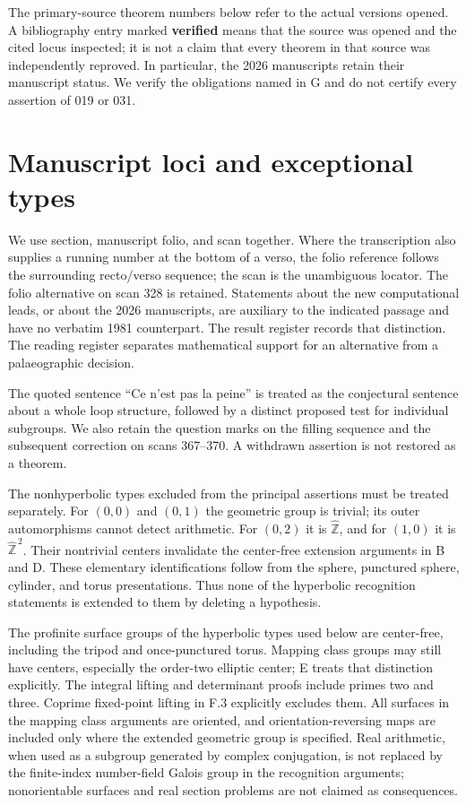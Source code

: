 \documentclass[10pt,a4paper]{article}
\begin{document}
The primary-source theorem numbers below refer to the actual versions opened. A bibliography entry marked \textbf{verified} means that the source was opened and the cited locus inspected; it is not a claim that every theorem in that source was independently reproved. In particular, the 2026 manuscripts retain their manuscript status. We verify the obligations named in G and do not certify every assertion of 019 or 031.

\section{Manuscript loci and exceptional types}\label{manuscript-loci-and-exceptional-types}

We use section, manuscript folio, and scan together. Where the transcription also supplies a running number at the bottom of a verso, the folio reference follows the surrounding recto/verso sequence; the scan is the unambiguous locator. The folio alternative on scan 328 is retained. Statements about the new computational leads, or about the 2026 manuscripts, are auxiliary to the indicated passage and have no verbatim 1981 counterpart. The result register records that distinction. The reading register separates mathematical support for an alternative from a palaeographic decision.

The quoted sentence ``Ce n'est pas la peine'' is treated as the conjectural sentence about a whole loop structure, followed by a distinct proposed test for individual subgroups. We also retain the question marks on the filling sequence and the subsequent correction on scans 367--370. A withdrawn assertion is not restored as a theorem.

The nonhyperbolic types excluded from the principal assertions must be treated separately. For \((0,0)\) and \((0,1)\) the geometric group is trivial; its outer automorphisms cannot detect arithmetic. For \((0,2)\) it is \(\widehat{\mathbb Z}\), and for \((1,0)\) it is \(\widehat{\mathbb Z}^{\,2}\). Their nontrivial centers invalidate the center-free extension arguments in B and D. These elementary identifications follow from the sphere, punctured sphere, cylinder, and torus presentations. Thus none of the hyperbolic recognition statements is extended to them by deleting a hypothesis.

The profinite surface groups of the hyperbolic types used below are center-free, including the tripod and once-punctured torus. Mapping class groups may still have centers, especially the order-two elliptic center; E treats that distinction explicitly. The integral lifting and determinant proofs include primes two and three. Coprime fixed-point lifting in F.3 explicitly excludes them. All surfaces in the mapping class arguments are oriented, and orientation-reversing maps are included only where the extended geometric group is specified. Real arithmetic, when used as a subgroup generated by complex conjugation, is not replaced by the finite-index number-field Galois group in the recognition arguments; nonorientable surfaces and real section problems are not claimed as consequences.
\end{document}

